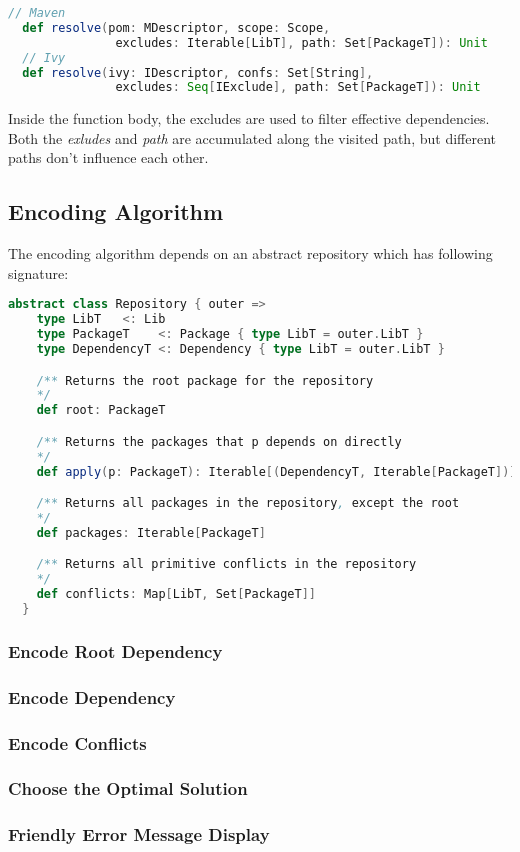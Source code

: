 \begin{lstlisting}[language=Scala]
  // Maven
  def resolve(pom: MDescriptor, scope: Scope,
               excludes: Iterable[LibT], path: Set[PackageT]): Unit
  // Ivy
  def resolve(ivy: IDescriptor, confs: Set[String],
               excludes: Seq[IExclude], path: Set[PackageT]): Unit
\end{lstlisting}

Inside the function body, the excludes are used to filter effective dependencies. Both the \emph{exludes} and \emph{path} are accumulated along the visited path, but different paths don't influence each other.

\subsection{Encoding Algorithm}

The encoding algorithm depends on an abstract repository which has following signature:

\begin{lstlisting}[language=Scala]
  abstract class Repository { outer =>
    type LibT   <: Lib
    type PackageT    <: Package { type LibT = outer.LibT }
    type DependencyT <: Dependency { type LibT = outer.LibT }

    /** Returns the root package for the repository
    */
    def root: PackageT

    /** Returns the packages that p depends on directly
    */
    def apply(p: PackageT): Iterable[(DependencyT, Iterable[PackageT])]

    /** Returns all packages in the repository, except the root
    */
    def packages: Iterable[PackageT]

    /** Returns all primitive conflicts in the repository
    */
    def conflicts: Map[LibT, Set[PackageT]]
  }
\end{lstlisting}

\subsubsection{Encode Root Dependency}

\subsubsection{Encode Dependency}

\subsubsection{Encode Conflicts}

\subsubsection{Choose the Optimal Solution}

\subsubsection{Friendly Error Message Display}
